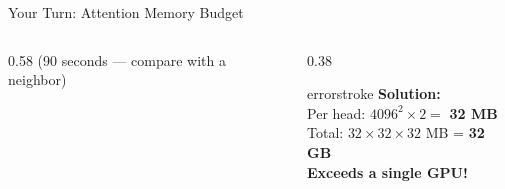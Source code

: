 \documentclass[aspectratio=169, 12pt]{beamer}
\begin{document}
\begin{frame}{Your Turn: Attention Memory Budget}
\begin{columns}[T]
\begin{column}{0.58\textwidth}
    {\footnotesize\textcolor{midgray}{(90 seconds --- compare with a neighbor)}}
  \end{column}
  \begin{column}{0.38\textwidth}
    \pause
    \begin{mlsyscard}{errorstroke}
    \textbf{Solution:}\\[0.05cm]
    {\footnotesize
    Per head: $4096^2 \times 2 = $ \textbf{32 MB}\\[0.05cm]
    Total: $32 \times 32 \times 32$ MB = \textbf{32 GB}\\[0.05cm]
    \textcolor{errorstroke}{\textbf{Exceeds a single GPU!}}
    }
    \end{mlsyscard}
  \end{column}
\end{columns}

\end{frame}
\end{document}
